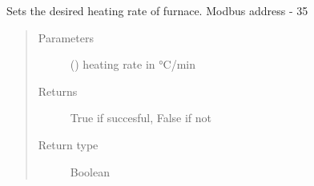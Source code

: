 \documentclass[letterpaper,10pt,english]{sphinxmanual}
\begin{document}
\begin{fulllineitems}
\begin{fulllineitems}
\label{\detokenize{source/laboratory.drivers:laboratory.drivers.furnace.Furnace.configure}}
\end{fulllineitems}


\begin{fulllineitems}
\label{\detokenize{source/laboratory.drivers:laboratory.drivers.furnace.Furnace.flush_input}}
\end{fulllineitems}


\begin{fulllineitems}
\label{\detokenize{source/laboratory.drivers:laboratory.drivers.furnace.Furnace.flush_output}}
\end{fulllineitems}


\begin{fulllineitems}
\label{\detokenize{source/laboratory.drivers:laboratory.drivers.furnace.Furnace.heating_rate}}
Sets the desired heating rate of furnace.
Modbus address - 35
\begin{quote}\begin{description}
\item[{Parameters}] \leavevmode
{} (\sphinxstyleliteralemphasis{\sphinxupquote{, }}) \textendash{} heating rate in °C/min

\item[{Returns}] \leavevmode
True if succesful, False if not

\item[{Return type}] \leavevmode
Boolean


\end{description}
\end{quote}
\end{fulllineitems}
\end{fulllineitems}
\end{document}
